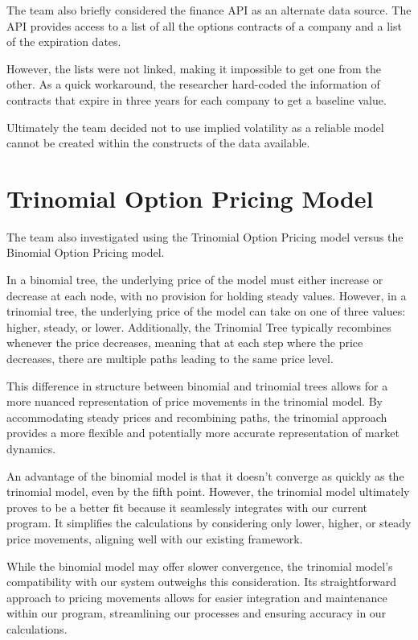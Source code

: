 \documentclass[11pt]{article}
\begin{document}
The team also briefly considered the finance API as an alternate data source. The API provides access to a list of all the options contracts of a company and a list of the expiration dates. 

However, the lists were not linked, making it impossible to get one from the other. As a quick workaround, the researcher hard-coded the information of contracts that expire in three years for each company to get a baseline value.

Ultimately the team decided not to use implied volatility as a reliable model cannot be created within the constructs of the data available.

\section{Trinomial Option Pricing Model}

The team also investigated using the Trinomial Option Pricing model versus the Binomial Option Pricing model. 

In a binomial tree, the underlying price of the model must either increase or decrease at each node, with no provision for holding steady values. However, in a trinomial tree, the underlying price of the model can take on one of three values: higher, steady, or lower. Additionally, the Trinomial Tree typically recombines whenever the price decreases, meaning that at each step where the price decreases, there are multiple paths leading to the same price level.

This difference in structure between binomial and trinomial trees allows for a more nuanced representation of price movements in the trinomial model. By accommodating steady prices and recombining paths, the trinomial approach provides a more flexible and potentially more accurate representation of market dynamics.

An advantage of the binomial model is that it doesn't converge as quickly as the trinomial model, even by the fifth point. However, the trinomial model ultimately proves to be a better fit because it seamlessly integrates with our current program. It simplifies the calculations by considering only lower, higher, or steady price movements, aligning well with our existing framework.

While the binomial model may offer slower convergence, the trinomial model's compatibility with our system outweighs this consideration. Its straightforward approach to pricing movements allows for easier integration and maintenance within our program, streamlining our processes and ensuring accuracy in our calculations.
\end{document}
